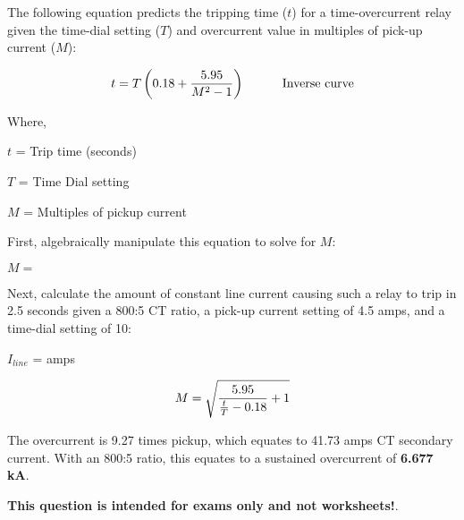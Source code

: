 

The following equation predicts the tripping time ($t$) for a time-overcurrent relay given the time-dial setting ($T$) and overcurrent value in multiples of pick-up current ($M$):

$$t = T \left(0.18 + {5.95 \over {M^2 - 1}} \right) \hskip 30pt \hbox{Inverse curve}$$



\noindent
Where,

$t$ = Trip time (seconds)

$T$ = Time Dial setting

$M$ = Multiples of pickup current

\vskip 20pt

\noindent
First, algebraically manipulate this equation to solve for $M$:

\vskip 10pt

$M = $

\vskip 20pt

\noindent
Next, calculate the amount of constant line current causing such a relay to trip in 2.5 seconds given a 800:5 CT ratio, a pick-up current setting of 4.5 amps, and a time-dial setting of 10:

\vskip 20pt

$I_{line}$ = \underbar{\hskip 50pt} amps

\vskip 10pt







$$M = \sqrt{{5.95 \over {{t \over T} - 0.18}} + 1}$$

The overcurrent is 9.27 times pickup, which equates to 41.73 amps CT secondary current.  With an 800:5 ratio, this equates to a sustained overcurrent of {\bf 6.677 kA}.







{\bf This question is intended for exams only and not worksheets!}.



